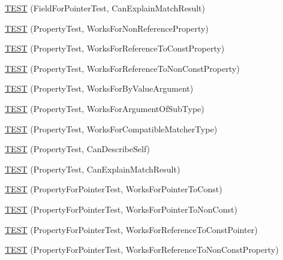 \begin{DoxyCompactItemize}
\item 
\hyperlink{namespacetesting_1_1gmock__matchers__test_a6a4ffd283f91f4e085aa582aedefe38e}{T\+E\+ST} (Field\+For\+Pointer\+Test, Can\+Explain\+Match\+Result)
\item 
\hyperlink{namespacetesting_1_1gmock__matchers__test_a9c42c3b244c7b4d63040e469d5b31e1e}{T\+E\+ST} (Property\+Test, Works\+For\+Non\+Reference\+Property)
\item 
\hyperlink{namespacetesting_1_1gmock__matchers__test_a7254899c6d45df648d5b4ef6eece3ae0}{T\+E\+ST} (Property\+Test, Works\+For\+Reference\+To\+Const\+Property)
\item 
\hyperlink{namespacetesting_1_1gmock__matchers__test_a5b7b02e8fcef1aff9a4afc81d5fb5d5f}{T\+E\+ST} (Property\+Test, Works\+For\+Reference\+To\+Non\+Const\+Property)
\item 
\hyperlink{namespacetesting_1_1gmock__matchers__test_af703b24e2bee13cf7a042f699809a5ab}{T\+E\+ST} (Property\+Test, Works\+For\+By\+Value\+Argument)
\item 
\hyperlink{namespacetesting_1_1gmock__matchers__test_a38a5ad623dda9ef0f48ebaf65485d18e}{T\+E\+ST} (Property\+Test, Works\+For\+Argument\+Of\+Sub\+Type)
\item 
\hyperlink{namespacetesting_1_1gmock__matchers__test_a17b7a59d1dbca0692ebaa71e6f46f1d6}{T\+E\+ST} (Property\+Test, Works\+For\+Compatible\+Matcher\+Type)
\item 
\hyperlink{namespacetesting_1_1gmock__matchers__test_a8c749e210723e33547e58fe8822fb85e}{T\+E\+ST} (Property\+Test, Can\+Describe\+Self)
\item 
\hyperlink{namespacetesting_1_1gmock__matchers__test_aff810d2cdd79c55d483965a28bb5069a}{T\+E\+ST} (Property\+Test, Can\+Explain\+Match\+Result)
\item 
\hyperlink{namespacetesting_1_1gmock__matchers__test_ac9222439b8e0b1e080650d667044c140}{T\+E\+ST} (Property\+For\+Pointer\+Test, Works\+For\+Pointer\+To\+Const)
\item 
\hyperlink{namespacetesting_1_1gmock__matchers__test_acc639f3cbeacf4af712bf02ac451b160}{T\+E\+ST} (Property\+For\+Pointer\+Test, Works\+For\+Pointer\+To\+Non\+Const)
\item 
\hyperlink{namespacetesting_1_1gmock__matchers__test_a028687dfb04ec008ea129f9cc95aac62}{T\+E\+ST} (Property\+For\+Pointer\+Test, Works\+For\+Reference\+To\+Const\+Pointer)
\item 
\hyperlink{namespacetesting_1_1gmock__matchers__test_a78762b60c9d0c985916b698e6d4c55e3}{T\+E\+ST} (Property\+For\+Pointer\+Test, Works\+For\+Reference\+To\+Non\+Const\+Property)

\end{DoxyCompactItemize}
